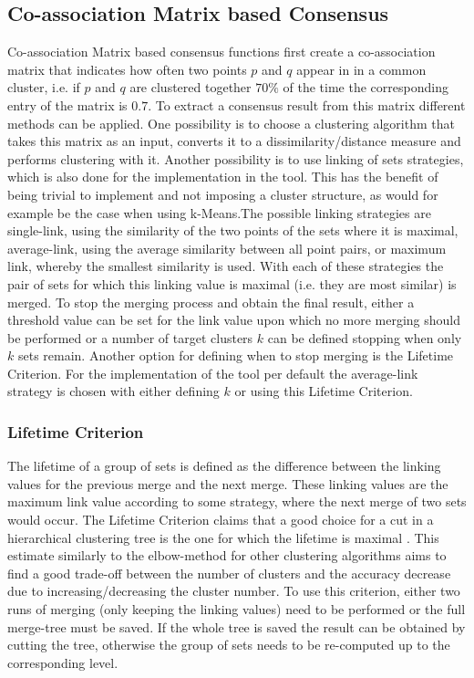 \documentclass[
	a4paper,
	english,
	twoside,
	openright,               
	11pt                            
	]{report}
\begin{document}
\subsection{Co-association Matrix based Consensus}
Co-association Matrix based consensus functions \cite{Monti2003} first create a co-association matrix that indicates how often two points $p$ and $q$ appear in in a common cluster, i.e. if $p$ and $q$ are clustered together $70\%$ of the time the corresponding entry of the matrix is $0.7$. To extract a consensus result from this matrix different methods can be applied. One possibility is to choose a clustering algorithm that takes this matrix as an input, converts it to a dissimilarity/distance measure and performs clustering with it. Another possibility is to use linking of sets strategies, which is also done for the implementation in the tool. This has the benefit of being trivial to implement and not imposing a cluster structure, as would for example be the case when using k-Means.The possible linking strategies are single-link, using the similarity of the two points of the sets where it is maximal, average-link, using the average similarity between all point pairs, or maximum link, whereby the smallest similarity is used. With each of these strategies the pair of sets for which this linking value is maximal (i.e. they are most similar) is merged. To stop the merging process and obtain the final result, either a threshold value can be set for the link value upon which no more merging should be performed or a number of target clusters $k$ can be defined stopping when only $k$ sets remain. Another option for defining when to stop merging is the Lifetime Criterion. For the implementation of the tool per default the average-link strategy is chosen with either defining $k$ or using this Lifetime Criterion.

\subsubsection{Lifetime Criterion}
The lifetime of a group of sets is defined as the difference between the linking values for the previous merge and the next merge. These linking values are the maximum link value according to some strategy, where the next merge of two sets would occur. The Lifetime Criterion claims that a good choice for a cut in a hierarchical clustering tree is the one for which the lifetime is maximal \cite{YANG201735}. This estimate similarly to the elbow-method for other clustering algorithms aims to find a good trade-off between the number of clusters and the accuracy decrease due to increasing/decreasing the cluster number. To use this criterion, either two runs of merging (only keeping the linking values) need to be performed or the full merge-tree must be saved. If the whole tree is saved the result can be obtained by cutting the tree, otherwise the group of sets needs to be re-computed up to the corresponding level.
\end{document}
